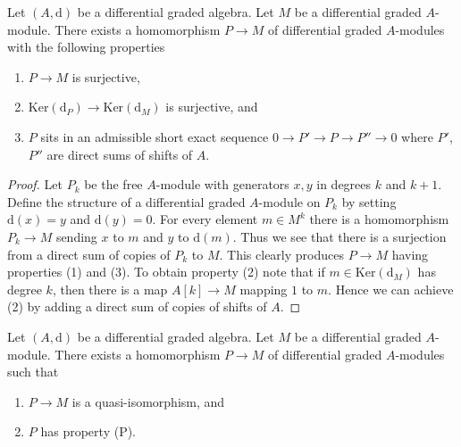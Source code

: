 \begin{lemma}
\label{lemma-good-quotient}
Let $(A, \text{d})$ be a differential graded algebra.
Let $M$ be a differential graded $A$-module. There exists a homomorphism
$P \to M$ of differential graded $A$-modules with the following
properties
\begin{enumerate}
\item $P \to M$ is surjective,
\item $\text{Ker}(\text{d}_P) \to \text{Ker}(\text{d}_M)$ is surjective, and
\item $P$ sits in an admissible short exact sequence
$0 \to P' \to P \to P'' \to 0$ where $P'$, $P''$ are direct sums
of shifts of $A$.
\end{enumerate}
\end{lemma}

\begin{proof}
Let $P_k$ be the free $A$-module with generators $x, y$ in degrees
$k$ and $k + 1$. Define the structure of a differential graded
$A$-module on $P_k$ by setting $\text{d}(x) = y$ and $\text{d}(y) = 0$.
For every element $m \in M^k$ there is a homomorphism
$P_k \to M$ sending $x$ to $m$ and $y$ to $\text{d}(m)$.
Thus we see that there is a surjection from a direct sum
of copies of $P_k$ to $M$. This clearly produces $P \to M$
having properties (1) and (3). To obtain property (2) note
that if $m \in \text{Ker}(\text{d}_M)$ has degree $k$, then there is a map
$A[k] \to M$ mapping $1$ to $m$. Hence we can achieve (2) by adding
a direct sum of copies of shifts of $A$.
\end{proof}

\begin{lemma}
\label{lemma-resolve}
Let $(A, \text{d})$ be a differential graded algebra.
Let $M$ be a differential graded $A$-module. There exists a homomorphism
$P \to M$ of differential graded $A$-modules such that
\begin{enumerate}
\item $P \to M$ is a quasi-isomorphism, and
\item $P$ has property (P).
\end{enumerate}
\end{lemma}

